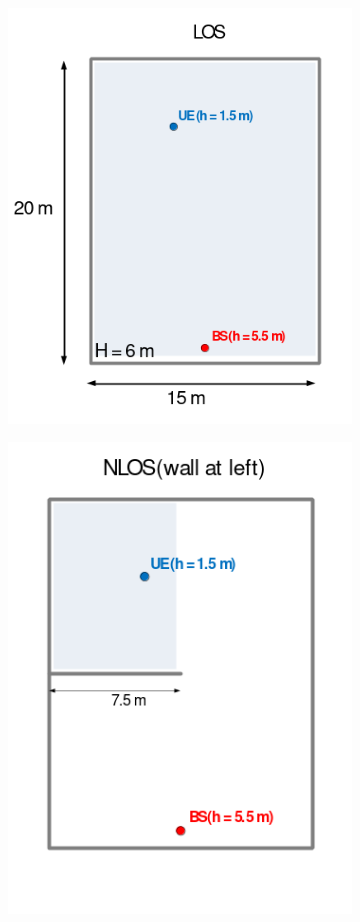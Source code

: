 \begin{figure}[ht]
  \centering
  \begin{subfigure}{0.49\linewidth}
    \centering
    \includegraphics[width=\linewidth]{figs/fig4.30a}
    \caption{}
    \label{fig:4.30a}
  \end{subfigure}
  \begin{subfigure}{0.49\linewidth}
    \centering
    \includegraphics[width=0.88\linewidth]{figs/fig4.30b}

\end{subfigure}
\end{figure}
